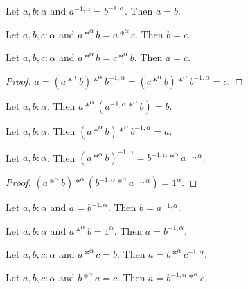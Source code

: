 \documentclass{article}
\begin{document}
\begin{forthel}
\begin{lemma}
Let $a,b : \alpha$ and $a^{-1,\alpha} = b^{-1,\alpha}$.
Then $a = b$.
\end{lemma}

\begin{lemma}
Let $a,b,c : \alpha$ and $a *^{\alpha} b = a *^{\alpha} c$.
Then $b = c$.
\end{lemma}

\begin{lemma}
Let $a,b,c : \alpha$ and $a *^{\alpha} b = c *^{\alpha} b$.
Then $a = c$.
\end{lemma}
\begin{proof}
$a = (a *^{\alpha} b) *^{\alpha} b^{-1,\alpha}
= (c *^{\alpha} b) *^{\alpha} b^{-1,\alpha} = c$.
\end{proof}

\begin{lemma}
Let $a,b : \alpha$.
Then $a *^{\alpha} (a^{-1,\alpha} *^{\alpha} b) = b$.
\end{lemma}

\begin{lemma}
Let $a,b : \alpha$.
Then $(a *^{\alpha} b) *^{\alpha} b^{-1,\alpha} = a$.
\end{lemma}


\begin{lemma}
Let $a,b : \alpha$.
Then $(a *^{\alpha} b)^{-1,\alpha} = b^{-1,\alpha} *^{\alpha} a^{-1,\alpha}$.
\end{lemma}
\begin{proof}
$(a *^{\alpha} b) *^{\alpha} (b^{-1,\alpha} *^{\alpha} a^{-1,\alpha})
= 1^{\alpha}$.
\end{proof}

\begin{lemma}
Let $a,b : \alpha$ and $a = b^{-1,\alpha}$.
Then $b = a^{-1,\alpha}$.
\end{lemma}

\begin{lemma}
Let $a,b : \alpha$ and $a *^{\alpha} b = 1^{\alpha}$.
Then $a = b^{-1,\alpha}$.
\end{lemma}

\begin{lemma}
Let $a,b,c : \alpha$ and $a *^{\alpha} c = b$.
Then $a = b *^{\alpha} c^{-1,\alpha}$.
\end{lemma}

\begin{lemma}
Let $a,b,c : \alpha$ and $b *^{\alpha} a = c$.
Then $a = b^{-1,\alpha} *^{\alpha} c$.
\end{lemma}


\end{forthel}
\end{document}
